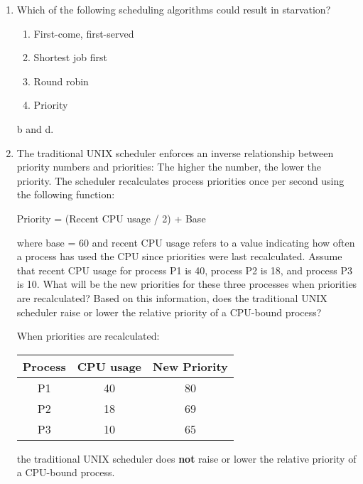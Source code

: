 \begin{enumerate}
    \item Which of the following scheduling algorithms could result in starvation?
    
    \begin{enumerate}
        \item First-come, first-served
        \item Shortest job first
        \item Round robin
        \item Priority
    \end{enumerate}
    
    b and d.
    
    \item The traditional UNIX scheduler enforces an inverse relationship between priority numbers and priorities: The higher the number, the lower the priority. The scheduler recalculates process priorities once per second using the following function: 
    
    Priority = (Recent CPU usage / 2) + Base
    
    where base = 60 and recent CPU usage refers to a value indicating how often a process has used the CPU since priorities were last recalculated. Assume that recent CPU usage for process P1 is 40, process P2 is 18, and process P3 is 10. What will be the new priorities for these three processes when priorities are recalculated? Based on this information, does the traditional UNIX scheduler raise or lower the relative priority of a CPU-bound process?
    
    When priorities are recalculated:
    
    \begin{center}
    \begin{tabular}{|c|c|c|}
        \hline
        Process & CPU usage & New Priority \\
        \hline
        P1 & 40 & 80 \\
        \hline
        P2 & 18 & 69 \\
        \hline
        P3 & 10 & 65 \\
        \hline
    \end{tabular}
    \end{center}
    
    the traditional UNIX scheduler does \textbf{not} raise or lower the relative priority of a CPU-bound process.

\end{enumerate}